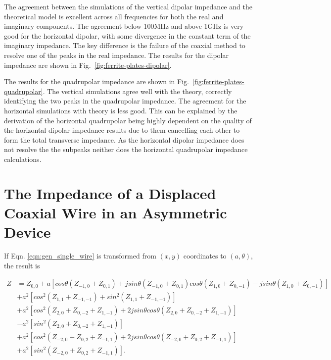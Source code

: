 \documentclass[review, number, sort&compress]{elsarticle}
\begin{document}
The agreement between the simulations of the vertical dipolar impedance and the theoretical model is excellent across all frequencies for both the real and imaginary components. The agreement below 100MHz and above 1GHz is very good for the horizontal dipolar, with some divergence in the constant term of the imaginary impedance. The key difference is the failure of the coaxial method to resolve one of the peaks in the real impedance. The results for the dipolar impedance are shown in Fig.~\ref{fig:ferrite-plates-dipolar}.

The results for the quadrupolar impedance are shown in Fig.~\ref{fig:ferrite-plates-quadrupolar}. The vertical simulations agree well with the theory, correctly identifying the two peaks in the quadrupolar impedance. The agreement for the horizontal simulations with theory is less good. This can be explained by the derivation of the horizontal quadrupolar being highly dependent on the quality of the horizontal dipolar impedance results due to them cancelling each other to form the total transverse impedance. As the horizontal dipolar impedance does not resolve the the subpeaks neither does the horizontal quadrupolar impedance calculations.

\section{The Impedance of a Displaced Coaxial Wire in an Asymmetric Device}
\label{sec:AsymMath}

If Eqn. \ref{eqn:gen_single_wire} is transformed from $\left( x,y \right)$ coordinates to $\left( a, \theta \right)$, the result is

\begin{align}
Z &=Z_{0,0} +a\left[ cos\theta \left( Z_{-1,0} + Z_{0,1} \right) +jsin\theta \left( Z_{-1,0} + Z_{0,1} \right)  cos\theta \left( Z_{1,0} + Z_{0,-1} \right) - jsin\theta \left( Z_{1,0} + Z_{0,-1} \right)\right] \nonumber \\
   &+a^{2}\left[ cos^{2} \left( Z_{1,1} + Z_{-1,-1} \right) + sin^{2} \left( Z_{1,1} + Z_{-1,-1} \right)\right] \nonumber \\
   &+a^{2}\left[ cos^{2} \left( Z_{2,0} + Z_{0,-2} +Z_{1,-1} \right) +2jsin\theta cos\theta\left( Z_{2,0} + Z_{0,-2} +Z_{1,-1} \right) \right] \nonumber \\
   & - a^{2}\left[sin^{2} \left( Z_{2,0} + Z_{0,-2} +Z_{1,-1} \right)\right] \nonumber  \\
   &+ a^{2}\left[ cos^{2} \left( Z_{-2,0} + Z_{0,2} +Z_{-1,1} \right) +2jsin\theta cos\theta\left( Z_{-2,0} + Z_{0,2} +Z_{-1,1}  \right) \right] \nonumber \\
   &+ a^{2}\left[sin^{2} \left( Z_{-2,0} + Z_{0,2} +Z_{-1,1}  \right) \right].
\end{align}
\end{document}
